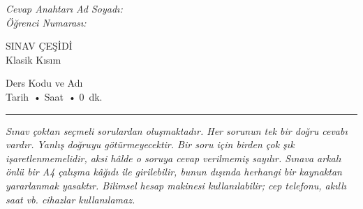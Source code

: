 \documentclass[12 pt]{exam}
\newcommand{\course}{Ders Kodu ve Adı} %
\newcommand{\exam}{SINAV ÇEŞİDİ \\ Klasik Kısım} %
\newcommand{\examdate}{Tarih} %
\newcommand{\examtime}{Saat} %
\newcommand{\duration}{0} %
\begin{document}
\noindent
\begin{minipage}{0.35\textwidth}
\ifprintanswers
\itshape
\Large{Cevap Anahtarı}
\else
Ad Soyadı: \\ %
Öğrenci Numarası: %
\fi
\end{minipage}%
%
\begin{minipage}{0.30\textwidth}
\bfseries
\begin{center}
\exam
\end{center}
\end{minipage}%
%
\begin{minipage}{0.35\textwidth}
\begin{flushright}
\course \\ %
\examdate\ • \examtime\ • \qty{\duration}{dk}.
\end{flushright}
\end{minipage}

\smallskip

\hrule

\medskip

\begingroup
\noindent
\footnotesize
\textit{%
Sınav çoktan seçmeli sorulardan oluşmaktadır. Her sorunun tek bir doğru cevabı vardır. Yanlış doğruyu götürmeyecektir. Bir soru için birden çok şık işaretlenmemelidir, aksi hâlde o soruya cevap verilmemiş sayılır. Sınava arkalı önlü bir A4 çalışma kâğıdı ile girilebilir, bunun dışında herhangi bir kaynaktan yararlanmak yasaktır. Bilimsel hesap makinesi kullanılabilir; cep telefonu, akıllı saat vb. cihazlar kullanılamaz.
}
\endgroup
\end{document}
